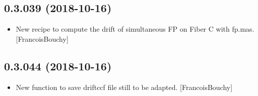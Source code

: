 \documentclass[a4paper,10pt,english]{report}
\begin{document}
\subsection{0.3.039 (2018-10-16)}
\label{\detokenize{misc/changelog:id293}}\begin{itemize}
\item {} 
New recipe to compute the drift of simultaneous FP on Fiber C with
fp.mas. {[}FrancoisBouchy{]}

\end{itemize}


\subsection{0.3.044 (2018-10-16)}
\label{\detokenize{misc/changelog:id294}}\begin{itemize}
\item {} 
New function  to save driftccf file
 still to be adapted. {[}FrancoisBouchy{]}

\end{itemize}
\end{document}
